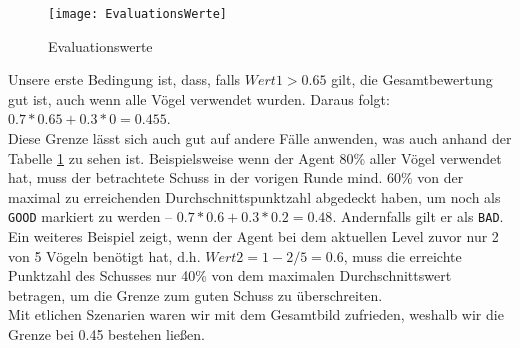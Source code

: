 \begin{figure}[H]
  \centering
    \texttt{[image: EvaluationsWerte]}
   \caption{Evaluationswerte}
   \label{evaluation}
\end{figure}

Unsere erste Bedingung ist, dass, falls $Wert1 > 0.65$ gilt, die Gesamtbewertung gut ist, auch wenn alle Vögel verwendet wurden. Daraus folgt: $0.7 * 0.65 + 0.3 * 0 = 0.455$. \\
Diese Grenze lässt sich auch gut auf andere Fälle anwenden, was auch anhand der Tabelle \ref{evaluation} zu sehen ist. Beispielsweise wenn der Agent 80\% aller Vögel verwendet hat, muss der betrachtete Schuss in der vorigen Runde mind. 60\% von der maximal zu erreichenden Durchschnittspunktzahl abgedeckt haben, um noch als \texttt{GOOD} markiert zu werden -- $0.7 * 0.6 + 0.3 * 0.2 = 0.48$. Andernfalls gilt er als \texttt{BAD}. \\ Ein weiteres Beispiel zeigt, wenn der Agent bei dem aktuellen Level zuvor nur 2 von 5 Vögeln benötigt hat, d.h. $Wert2 = 1 - 2/5 = 0.6$, muss die erreichte Punktzahl des Schusses nur 40\% von dem maximalen Durchschnittswert betragen, um die Grenze zum guten Schuss zu überschreiten. \\
Mit etlichen Szenarien waren wir mit dem Gesamtbild zufrieden, weshalb wir die Grenze bei 0.45 bestehen lie\ss en.